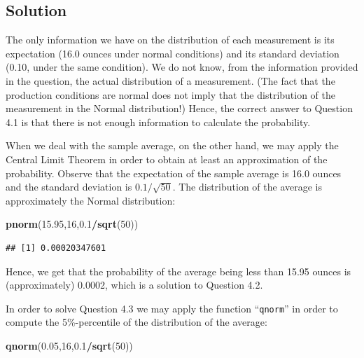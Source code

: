 \documentclass[]{krantz}
\makeatletter
\newenvironment{Shaded}{\begin{snugshade}}{\end{snugshade}}
\newcommand{\DecValTok}[1]{\textcolor[rgb]{0.00,0.00,0.81}{#1}}
\newcommand{\FloatTok}[1]{\textcolor[rgb]{0.00,0.00,0.81}{#1}}
\newcommand{\KeywordTok}[1]{\textcolor[rgb]{0.13,0.29,0.53}{\textbf{#1}}}
\newcommand{\NormalTok}[1]{#1}
\newcommand{\OperatorTok}[1]{\textcolor[rgb]{0.81,0.36,0.00}{\textbf{#1}}}
\newenvironment{kframe}{%
\medskip{}
\setlength{\fboxsep}{.8em}
 \def\at@end@of@kframe{}%
 \ifinner\ifhmode%
  \def\at@end@of@kframe{\end{minipage}}%
  \begin{minipage}{\columnwidth}%
 \fi\fi%
 \def\FrameCommand##1{\hskip\@totalleftmargin \hskip-\fboxsep
 \colorbox{shadecolor}{##1}\hskip-\fboxsep
     \hskip-\linewidth \hskip-\@totalleftmargin \hskip\columnwidth}%
 \MakeFramed {\advance\hsize-\width
   \@totalleftmargin\z@ \linewidth\hsize
   \@setminipage}}%
 {\par\unskip\endMakeFramed%
 \at@end@of@kframe}
\renewenvironment{Shaded}{\begin{kframe}}{\end{kframe}}
\theoremstyle{definition}
\theoremstyle{definition}
\theoremstyle{definition}
\theoremstyle{remark}
\makeatother
\begin{document}
\hypertarget{solution-3}{%
\subsection*{Solution}\label{solution-3}}


The only information we have on the distribution of each measurement is
its expectation (16.0 ounces under normal conditions) and its standard
deviation (0.10, under the same condition). We do not know, from the
information provided in the question, the actual distribution of a
measurement. (The fact that the production conditions are normal does
not imply that the distribution of the measurement in the Normal
distribution!) Hence, the correct answer to Question 4.1 is that there
is not enough information to calculate the probability.

When we deal with the sample average, on the other hand, we may apply
the Central Limit Theorem in order to obtain at least an approximation
of the probability. Observe that the expectation of the sample average
is 16.0 ounces and the standard deviation is \(0.1/\sqrt{50}\). The
distribution of the average is approximately the Normal distribution:

\begin{Shaded}
\begin{Highlighting}[]
\KeywordTok{pnorm}\NormalTok{(}\FloatTok{15.95}\NormalTok{,}\DecValTok{16}\NormalTok{,}\FloatTok{0.1}\OperatorTok{/}\KeywordTok{sqrt}\NormalTok{(}\DecValTok{50}\NormalTok{))}
\end{Highlighting}
\end{Shaded}

\begin{verbatim}
## [1] 0.00020347601
\end{verbatim}

Hence, we get that the probability of the average being less than 15.95
ounces is (approximately) 0.0002, which is a solution to Question 4.2.

In order to solve Question 4.3 we may apply the function ``\texttt{qnorm}'' in
order to compute the 5\%-percentile of the distribution of the average:

\begin{Shaded}
\begin{Highlighting}[]
\KeywordTok{qnorm}\NormalTok{(}\FloatTok{0.05}\NormalTok{,}\DecValTok{16}\NormalTok{,}\FloatTok{0.1}\OperatorTok{/}\KeywordTok{sqrt}\NormalTok{(}\DecValTok{50}\NormalTok{))}
\end{Highlighting}
\end{Shaded}
\end{document}
